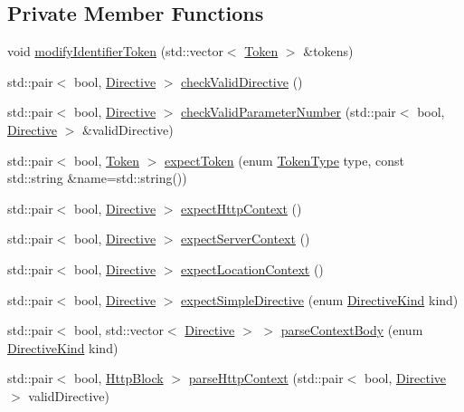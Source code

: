 \subsection*{Private Member Functions}
\begin{DoxyCompactItemize}
\item 
void \hyperlink{classft_1_1_parser_a8226e5286bd1e9354998fe9e6bb63d08}{modify\+Identifier\+Token} (std\+::vector$<$ \hyperlink{classft_1_1_token}{Token} $>$ \&tokens)
\item 
std\+::pair$<$ bool, \hyperlink{classft_1_1_directive}{Directive} $>$ \hyperlink{classft_1_1_parser_ad48298d21629daf7c9a31e101bf322ba}{check\+Valid\+Directive} ()
\item 
std\+::pair$<$ bool, \hyperlink{classft_1_1_directive}{Directive} $>$ \hyperlink{classft_1_1_parser_a31501116433b0b1f8d9d58f27658ea98}{check\+Valid\+Parameter\+Number} (std\+::pair$<$ bool, \hyperlink{classft_1_1_directive}{Directive} $>$ \&valid\+Directive)
\item 
std\+::pair$<$ bool, \hyperlink{classft_1_1_token}{Token} $>$ \hyperlink{classft_1_1_parser_a1615a752d3642bb53598e2c8db810db0}{expect\+Token} (enum \hyperlink{namespaceft_aa520fbf142ba1e7e659590c07da31921}{Token\+Type} type, const std\+::string \&name=std\+::string())
\item 
std\+::pair$<$ bool, \hyperlink{classft_1_1_directive}{Directive} $>$ \hyperlink{classft_1_1_parser_abcf864a160e3c4e1866edceae06b921b}{expect\+Http\+Context} ()
\item 
std\+::pair$<$ bool, \hyperlink{classft_1_1_directive}{Directive} $>$ \hyperlink{classft_1_1_parser_a72f108d920a35284bf8f740bb8240acd}{expect\+Server\+Context} ()
\item 
std\+::pair$<$ bool, \hyperlink{classft_1_1_directive}{Directive} $>$ \hyperlink{classft_1_1_parser_a002b236022851df6ef2203aab9b24a73}{expect\+Location\+Context} ()
\item 
std\+::pair$<$ bool, \hyperlink{classft_1_1_directive}{Directive} $>$ \hyperlink{classft_1_1_parser_a292bf0ed87b8e81b59cefb72c70152bd}{expect\+Simple\+Directive} (enum \hyperlink{namespaceft_a5a5554dff10f0dc50bae4cc5825ad75d}{Directive\+Kind} kind)
\item 
std\+::pair$<$ bool, std\+::vector$<$ \hyperlink{classft_1_1_directive}{Directive} $>$ $>$ \hyperlink{classft_1_1_parser_a2d0fd9222eca5d8ea7e8fbb79f0a30be}{parse\+Context\+Body} (enum \hyperlink{namespaceft_a5a5554dff10f0dc50bae4cc5825ad75d}{Directive\+Kind} kind)
\item 
std\+::pair$<$ bool, \hyperlink{classft_1_1_http_block}{Http\+Block} $>$ \hyperlink{classft_1_1_parser_a17a213759b2cca8e91ca225b2e86739d}{parse\+Http\+Context} (std\+::pair$<$ bool, \hyperlink{classft_1_1_directive}{Directive} $>$ valid\+Directive)

\end{DoxyCompactItemize}
